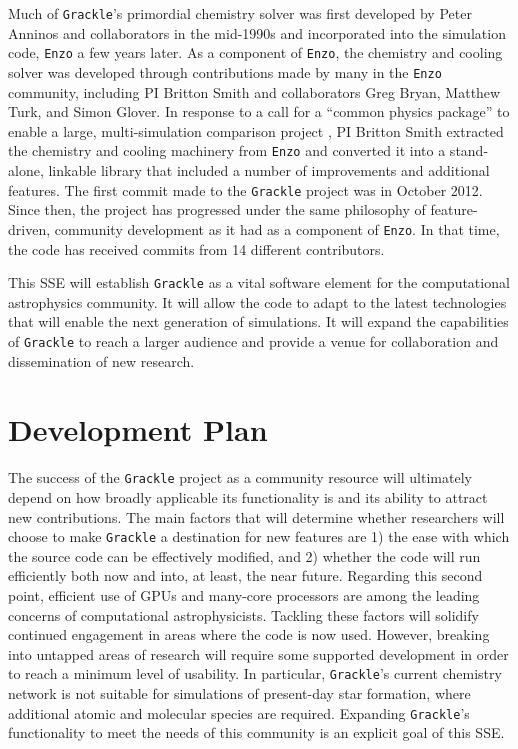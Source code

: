 \documentclass[11pt]{article}
\newcommand{\grackle}{\texttt{Grackle}}
\begin{document}
\begin{flushleft}
Much of \grackle{}'s primordial chemistry solver was first developed
by Peter Anninos and collaborators in the mid-1990s
\citep{1997NewA....2..209A, 1997NewA....2..181A} and incorporated into
the simulation code, \texttt{Enzo} \citep[][licensed under the
  3-clause, revised BSD license]{2014ApJS..211...19B} a few
years later.  As a component of \texttt{Enzo}, the chemistry and
cooling solver was developed through contributions made by many in the
\texttt{Enzo} community, including PI Britton Smith and collaborators
Greg Bryan, Matthew Turk, and Simon Glover.  In response to a call for
a ``common physics package'' to enable a large, multi-simulation
comparison project \citep[AGORA,][]{2014ApJS..210...14K,
  2016ApJ...833..202K}, PI Britton Smith extracted the chemistry and
cooling machinery from \texttt{Enzo} and converted it into a
stand-alone, linkable library that included a number of improvements
and additional features.  The first commit made to the \grackle{}
project was in October 2012.  Since then, the project has progressed
under the same philosophy of feature-driven, community development as
it had as a component of \texttt{Enzo}.  In that time, the code has
received commits from 14 different contributors.

This SSE will establish \grackle{} as a vital software element for the
computational astrophysics community.  It will allow the code to adapt
to the latest technologies that will enable the next generation of
simulations.  It will expand the capabilities of \grackle{} to reach a
larger audience and provide a venue for collaboration and
dissemination of new research.

\section{Development Plan}

The success of the \grackle{} project as a community resource will
ultimately depend on how broadly applicable its functionality is and
its ability to attract new contributions.  The main factors
that will determine whether researchers will choose to make \grackle{}
a destination for new features are 1) the ease with which the source
code can be effectively modified, and 2) whether the code will run
efficiently both now and into, at least, the near future.  Regarding
this second point, efficient use of GPUs and many-core processors are
among the leading concerns of computational astrophysicists.  Tackling
these factors will solidify continued engagement in areas where the
code is now used.  However, breaking into untapped areas of research
will require some supported development in order to reach a minimum
level of usability.  In particular, \grackle{}'s current chemistry
network is not suitable for simulations of present-day star formation,
where additional atomic and molecular species are required.  Expanding
\grackle{}'s functionality to meet the needs of this community is an
explicit goal of this SSE.


\end{flushleft}
\end{document}
